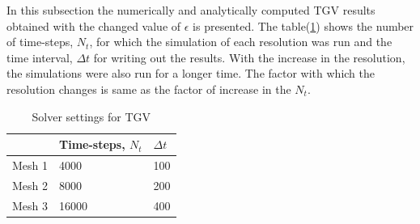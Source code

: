 In this subsection the numerically and analytically computed TGV results obtained with the changed value of $\epsilon$ is presented. The table(\ref{solver TGV}) shows the number of time-steps, $N_t$, for which the simulation of each resolution was run and the time interval, $\Delta t$ for writing out the results. With the increase in the resolution, the simulations were also run for a longer time. The factor with which the resolution changes is same as the factor of increase in the $N_t$.

%
\begin{table}[h!]
\begin{center}
\begin{tabular}{ p{1.5cm}|p{2.5cm}|p{1cm}} 

 & Time-steps, $N_t$ & $\Delta t$\\
  \hline
   Mesh 1& 4000 & 100\\
  \hline
  Mesh 2& 8000& 200\\
  \hline
  Mesh 3 & 16000 & 400\\
  \hline
\end{tabular}
\end{center}
\caption{Solver settings for TGV}
\label{solver TGV}
\end{table}
%

%
\begin{figure}[h]
\begin{minipage}[b]{0.5\textwidth}
\end{minipage}
\end{figure}
%

